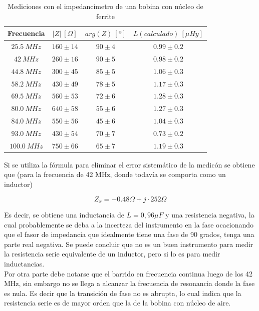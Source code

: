 \documentclass[a4paper,10pt]{article}
\begin{document}
		\begin{table}[!htp]
			\centering
			\begin{tabular}{|c|c|c|c|}
				\hline
				Frecuencia & $\left|Z\right|~[\Omega]$ & $arg(Z)~[º]$ & 
				$L (calculado)~[\mu Hy]$\\
				\hline
				$25.5~MHz$ & $160\pm14$ & $90\pm4$ & $0.99\pm0.2$ \\
				\hline
				$42~MHz$ & $260\pm16$ & $90\pm5$ & $0.98\pm0.2$\\
				\hline
				$44.8~MHz$ & $300\pm45$ & $85\pm5$ & $1.06\pm0.3$ \\
				\hline
				$58.2~MHz$ & $430\pm49$ & $78\pm5$ & $1.17\pm0.3$ \\
				\hline									
				$69.5~MHz$ & $560\pm53$ & $72\pm6$ & $1.28\pm0.3$ \\
				\hline									
				$80.0~MHz$& $640\pm58$ & $55\pm6$ & $1.27\pm0.3$ \\
				\hline									
				$84.0~MHz$ & $550\pm56$ & $45\pm6$ & $1.04\pm0.3$ \\
				\hline									
				$93.0~MHz$ & $430\pm54$ & $70\pm7$ & $0.73\pm0.2$ \\
				\hline									
				$100.0~MHz$ & $750\pm66$ & $65\pm7$ & $1.19\pm0.3$ \\
				\hline			
			\end{tabular}
			\caption{Mediciones con el impedanc\'imetro de una bobina con 
			n\'ucleo de ferrite} \label{tabIMPbobina}
		\end{table}	
		
		\indent Si se utiliza la f\'ormula para eliminar el error sistem\'atico 
		de la medic\'on se obtiene que (para la frecuencia de 42 MHz, donde 
		todav\'ia se comporta como un inductor)
		
		$$Z_x=-0.48\Omega+j\cdot 252\Omega$$
		
		\indent Es decir, se obtiene una inductancia de $L=0,96 \mu F$ y una 
		resistencia negativa, la cual probablemente se deba a la incerteza del 
		instrumento en la fase ocacionando que el fasor de impedancia que 
		idealmente tiene una fase de 90 grados, tenga una parte real negativa. 
		Se puede concluir que no es un buen instrumento para medir la 
		resistencia serie equivalente de un inductor, pero si lo es para medir 
		inductancias. \\
		\indent Por otra parte debe notarse que el barrido en frecuencia 
		continua luego de los 42 MHz, sin embargo no se llega a alcanzar la 
		frecuencia de resonancia donde la fase es nula. Es decir que la 
		transici\'on de fase no es abrupta, lo cual indica que la resistencia 
		serie es de mayor orden que la de la bobina con n\'ucleo de aire. 
\end{document}
